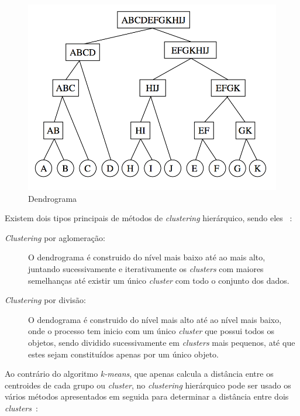 \begin{figure}[h]
\centering
\includegraphics[width=0.6\linewidth]{./figures/hierarquico}
\caption{Dendrograma~\citet{Bramer2007}}
\label{fig:hierarquico}
\end{figure}

Existem dois tipos principais de métodos de \textit{clustering} hierárquico, sendo eles~\citet{Liu2011} :

\begin{description}
\item[\textit{Clustering} por aglomeração:] O dendrograma é construido do nível mais baixo até ao mais alto, juntando sucessivamente e iterativamente os \textit{clusters} com maiores semelhanças até existir um único \textit{cluster} com todo o conjunto dos dados.

\item[\textit{Clustering} por divisão:] O dendograma é construido do nível mais alto até ao nível mais baixo, onde o processo tem inicio com um único \textit{cluster} que possui todos os objetos, sendo dividido sucessivamente em \textit{clusters} mais pequenos, até que estes sejam constituídos apenas por um único objeto.
\end{description}

Ao contrário do algoritmo \textit{k-means}, que apenas calcula a distância entre os centroides de cada grupo ou \textit{cluster}, no \textit{clustering} hierárquico pode ser usado os vários métodos  apresentados em seguida para determinar a distância entre dois \textit{clusters}~\citet{Liu2011}: 

